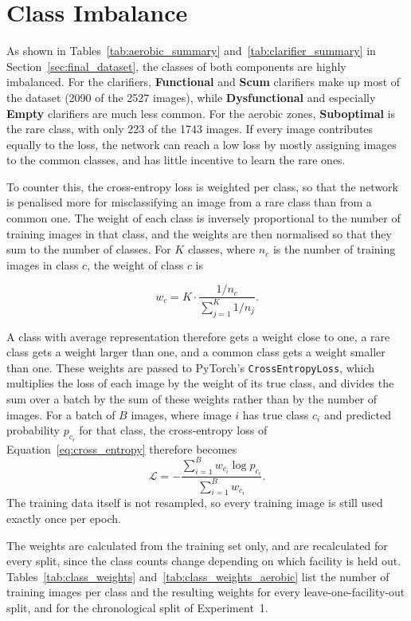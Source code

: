 \section{Class Imbalance}
\label{sec:exp_loss}

As shown in Tables~\ref{tab:aerobic_summary} and~\ref{tab:clarifier_summary} in Section~\ref{sec:final_dataset}, the classes of both components are highly imbalanced. For the clarifiers, \textbf{Functional} and \textbf{Scum} clarifiers make up most of the dataset (2090 of the 2527 images), while \textbf{Dysfunctional} and especially \textbf{Empty} clarifiers are much less common. For the aerobic zones, \textbf{Suboptimal} is the rare class, with only 223 of the 1743 images. If every image contributes equally to the loss, the network can reach a low loss by mostly assigning images to the common classes, and has little incentive to learn the rare ones.

To counter this, the cross-entropy loss is weighted per class, so that the network is penalised more for misclassifying an image from a rare class than from a common one. The weight of each class is inversely proportional to the number of training images in that class, and the weights are then normalised so that they sum to the number of classes. For $K$ classes, where $n_c$ is the number of training images in class $c$, the weight of class $c$ is

\begin{equation}
    w_c = K \cdot \frac{1/n_c}{\sum_{j=1}^{K} 1/n_j}.
\end{equation}

A class with average representation therefore gets a weight close to one, a rare class gets a weight larger than one, and a common class gets a weight smaller than one. These weights are passed to PyTorch's \texttt{CrossEntropyLoss}, which multiplies the loss of each image by the weight of its true class, and divides the sum over a batch by the sum of these weights rather than by the number of images. For a batch of $B$ images, where image $i$ has true class $c_i$ and predicted probability $p_{c_i}$ for that class, the cross-entropy loss of Equation~\ref{eq:cross_entropy} therefore becomes
\begin{equation}
    \mathcal{L} = -\frac{\sum_{i=1}^{B} w_{c_i} \log p_{c_i}}{\sum_{i=1}^{B} w_{c_i}}.
\end{equation}
The training data itself is not resampled, so every training image is still used exactly once per epoch.

The weights are calculated from the training set only, and are recalculated for every split, since the class counts change depending on which facility is held out. Tables~\ref{tab:class_weights} and~\ref{tab:class_weights_aerobic} list the number of training images per class and the resulting weights for every leave-one-facility-out split, and for the chronological split of Experiment~1.

